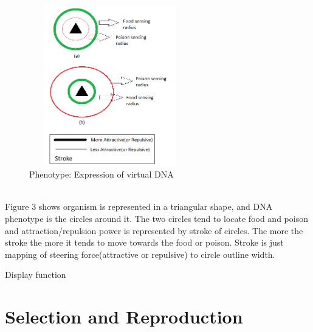 \documentclass[conference]{IEEEtran}
\begin{document}
\begin{figure}
	\includegraphics[height=7cm,width=7cm]{phenotype.png}
	\caption{Phenotype: Expression of virtual DNA}
	\label{fig:phenotype}
\end{figure}
\\Figure 3 shows organism is represented in a triangular shape, and DNA phenotype is the circles around it. The two circles tend to locate food and poison and attraction/repulsion power is represented by stroke of circles. The more the stroke the more it tends to move towards the food or poison. Stroke is just mapping of steering force(attractive or repulsive) to circle outline width.

\begin{algorithm}
\caption{Display function}
\begin{algorithmic} 
\end{algorithmic}
\end{algorithm}

\section{Selection and Reproduction}
\end{document}
